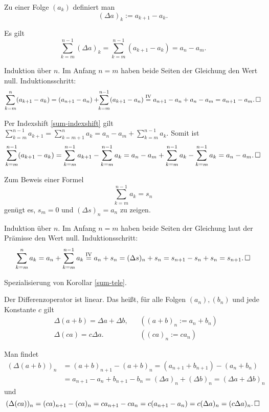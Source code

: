 \begin{Definition}[Differenzenfolge] Zu einer Folge $(a_k)$ definiert man
\[(\Delta a)_k := a_{k+1} - a_k.\]
\end{Definition}

\begin{Korollar}[Teleskopsumme]\label{sum-tele} Es gilt
\[\sum_{k=m}^{n-1} (\Delta a)_k = \sum_{k=m}^{n-1} (a_{k+1} - a_k) = a_n - a_m.\]
\end{Korollar}
\begin{Beweis}[Beweis 1] Induktion über $n$. Im Anfang $n=m$ haben beide Seiten
der Gleichung den Wert null. Induktionsschritt:
\[\sum_{k=m}^n (a_{k+1} - a_k) = (a_{n+1} - a_n) + \!\!\sum_{k=m}^{n-1} (a_{k+1} - a_n)
\stackrel{\mathrm{IV}}= a_{n+1} - a_n + a_n - a_m = a_{n+1} - a_m.\,\square\]
\end{Beweis}
\begin{Beweis}[Beweis 2]
Per Indexshift \ref{sum-indexshift}
gilt $\sum\limits_{k=m}^{n-1} a_{k+1} = \!\!\sum\limits_{k=m+1}^n\!\! a_k
= a_n - a_m + \sum\limits_{k=m}^{n-1} a_k$.
Somit ist%
\[\sum_{k=m}^{n-1} (a_{k+1} - a_k) = \sum_{k=m}^{n-1} a_{k+1} - \sum_{k=m}^{n-1} a_k
= a_n - a_m + \sum_{k=m}^{n-1} a_k - \sum_{k=m}^{n-1} a_k = a_n - a_m.\,\square\]
\end{Beweis}

\begin{Korollar}
Zum Beweis einer Formel
\[\sum_{k=m}^{n-1} a_k = s_n\]
genügt es, $s_m=0$ und $(\Delta s)_n = a_n$ zu zeigen.
\end{Korollar}
\begin{Beweis}[Beweis 1]
Induktion über $n$. Im Anfang $n=m$ haben beide Seiten der Gleichung laut
der Prämisse den Wert null. Induktionsschritt:
\[\sum_{k=m}^n a_k = a_n + \sum_{k=m}^{n-1} a_k
\stackrel{\mathrm{IV}}= a_n + s_n
= (\Delta s)_n + s_n = s_{n+1} - s_n + s_n = s_{n+1}.\,\square\]
\end{Beweis}
\begin{Beweis}[Beweis 2]
Spezialisierung von Korollar \ref{sum-tele}.\,\qedsymbol
\end{Beweis}

\begin{Korollar} Der Differenzoperator ist linear. Das heißt,
für alle Folgen $(a_n), (b_n)$ und jede Konstante $c$ gilt
\begin{align*}
& \Delta(a+b) = \Delta a + \Delta b, && ((a+b)_n := a_n + b_n)\\
& \Delta(ca) = c\Delta a. && ((ca)_n := ca_n)
\end{align*}
\end{Korollar}
\begin{Beweis} Man findet
\begin{align*}
(\Delta(a+b))_n &= (a+b)_{n+1} - (a+b)_n
= (a_{n+1}+b_{n+1}) - (a_n+b_n)\\
&= a_{n+1}-a_n + b_{n+1}-b_n = (\Delta a)_n + (\Delta b)_n
= (\Delta a + \Delta b)_n
\end{align*}
und
\[(\Delta(ca))_n = (ca)_{n+1} - (ca)_n = ca_{n+1} - ca_n
= c(a_{n+1} - a_n) = c(\Delta a)_n = (c\Delta a)_n.\,\square\]
\end{Beweis}

